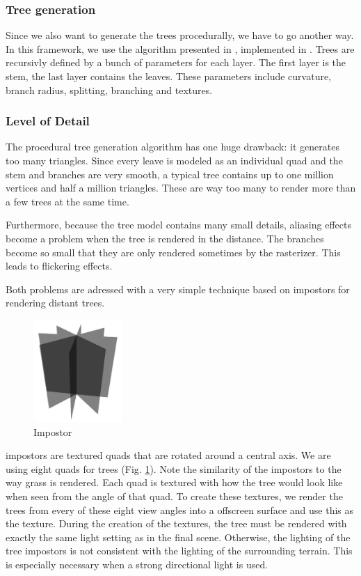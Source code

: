 \documentclass[journal, letterpaper]{IEEEtran}
\begin{document}
\subsubsection{Tree generation}\label{TreeGeneration}
Since we also want to generate the trees procedurally, we have to go another way. In this framework, we use the algorithm presented in \cite{Weber.}, implemented in \cite{WolframDiestel.2013}.
Trees are recursivly defined by a bunch of parameters for each layer. The first layer is the stem, the last layer contains the leaves. These parameters include curvature, branch radius, splitting, branching and textures.

\subsubsection{Level of Detail}\label{LevelOfDetail}
The procedural tree generation algorithm has one huge drawback: it generates too many triangles. Since every leave is modeled as an individual quad and the stem and branches are very smooth, a typical tree contains up to one million vertices and half a million triangles. These are way too many to render more than a few trees at the same time.

Furthermore, because the tree model contains many small details, aliasing effects become a problem when the tree is rendered in the distance. The branches become so small that they are only rendered sometimes by the rasterizer. This leads to flickering effects.

Both problems are adressed with a very simple technique based on impostors for rendering distant trees.
\begin{figure}[htbp]
	\centering
		\includegraphics[width=0.30\textwidth]{images/Impostor}
	\caption{Impostor}
	\label{fig:Impostor}
\end{figure}
impostors are textured quads that are rotated around a central axis. We are using eight quads for trees (Fig. \ref{fig:Impostor}). Note the similarity of the impostors to the way grass is rendered. Each quad is textured with how the tree would look like when seen from the angle of that quad. To create these textures, we render the trees from every of these eight view angles into a offscreen surface and use this as the texture.
During the creation of the textures, the tree must be rendered with exactly the same light setting as in the final scene. Otherwise, the lighting of the tree impostors is not consistent with the lighting of the surrounding terrain. This is especially necessary when a strong directional light is used.
\end{document}

